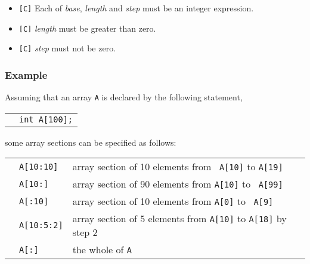 \begin{itemize}
 \item \verb![C]! Each of {\it base}, {\it length} and {\it step} must
       be an integer expression.
 \item \verb![C]! {\it length} must be greater than zero.
 \item \verb![C]! {\it step} must not be zero.
\end{itemize}

\subsubsection*{Example}

Assuming that an array {\tt A} is declared by the following statement,

\vspace{0.3cm}

\begin{tabular}{ll}
\hspace{0.5cm} & {\tt int A[100];} \\
\end{tabular}

\vspace{0.3cm}

\hspace{-0.55cm}some array sections can be specified as follows:

\vspace{0.3cm}

\begin{tabular}{lll}
\hspace{0.5cm} & {\tt A[10:10]} & array section of 10 elements from {\tt
 A[10]} to {\tt A[19]} \\
 & {\tt A[10:]} & array section of 90 elements from {\tt A[10]} to {\tt
	 A[99]} \\
 & {\tt A[:10]} & array section of 10 elements from {\tt A[0]} to {\tt
	 A[9]} \\
 & {\tt A[10:5:2]} & array section of 5 elements from {\tt A[10]} to
	 {\tt A[18]} by step 2 \\
 & {\tt A[:]} & the whole of {\tt A} \\
\end{tabular}

